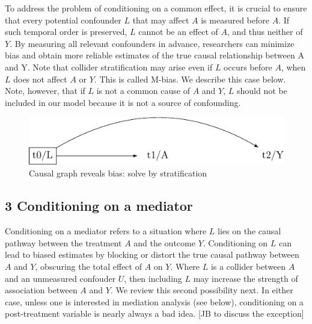\documentclass[
  singlecolumn]{report}
\begin{document}
To address the problem of conditioning on a common effect, it is crucial
to ensure that every potential confounder \(L\) that may affect \(A\) is
measured before \(A\). If such temporal order is preserved, \(L\) cannot
be an effect of \(A\), and thus neither of \(Y\). By measuring all
relevant confounders in advance, researchers can minimize bias and
obtain more reliable estimates of the true causal relationship between A
and Y. Note that collider stratification may arise even if \(L\) occurs
before \(A\), when \(L\) does not affect \(A\) or \(Y\). This is called
M-bias. We describe this case below. Note, however, that if \(L\) is not
a common cause of \(A\) and \(Y\), \(L\) should not be included in our
model because it is not a source of confounding.

\begin{figure}

{\centering \includegraphics[width=1\textwidth,height=\textheight]{causal-dags_files/figure-pdf/fig-dag-common-effect-solution-1.pdf}

}

\caption{\label{fig-dag-common-effect-solution}Causal graph reveals
bias: solve by stratification}

\end{figure}

\hypertarget{conditioning-on-a-mediator}{%
\subsection{3 Conditioning on a
mediator}\label{conditioning-on-a-mediator}}

Conditioning on a mediator refers to a situation where \(L\) lies on the
causal pathway between the treatment \(A\) and the outcome \(Y\).
Conditioning on \(L\) can lead to biased estimates by blocking or
distort the true causal pathway between \(A\) and \(Y\), obscuring the
total effect of \(A\) on \(Y\). Where \(L\) is a collider between \(A\)
and an unmeasured confouder \(U\), then including \(L\) may increase the
strength of association between \(A\) and \(Y\). We review this second
possibility next. In either case, unless one is interested in mediation
analysis (see below), conditioning on a post-treatment variable is
nearly always a bad idea. {[}JB to discuss the exception{]}
\end{document}
